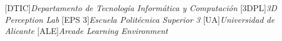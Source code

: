 [DTIC]{\emph{Departamento de Tecnología Informática y Computación}}
[3DPL]{\emph{3D Perception Lab}}
[EPS 3]{\emph{Escuela Politécnica Superior 3}}
[UA]{\emph{Universidad de Alicante}}
[ALE]{\emph{Arcade Learning Environment}}
